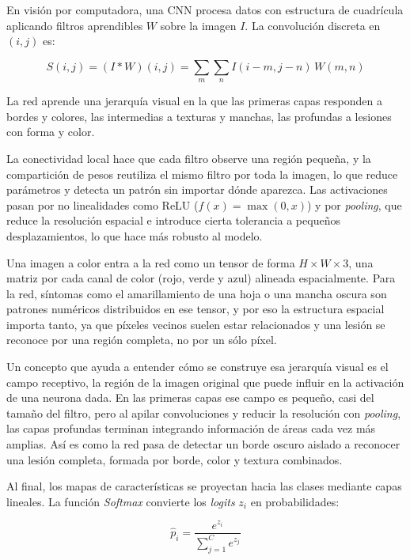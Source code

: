\documentclass[12pt,letterpaper]{article}
\begin{document}
En visión por computadora, una CNN procesa datos con estructura de cuadr\'icula aplicando filtros aprendibles $W$ sobre la imagen $I$. La convoluci\'on discreta en $(i,j)$ es:

\begin{equation}
S(i,j) = (I * W)(i,j) = \sum_{m}\sum_{n} I(i-m, j-n)\, W(m,n)
\end{equation}

La red aprende una jerarqu\'ia visual en la que las primeras capas responden a bordes y colores, las intermedias a texturas y manchas, las profundas a lesiones con forma y color.

La conectividad local hace que cada filtro observe una regi\'on peque\~na, y la compartici\'on de pesos reutiliza el mismo filtro por toda la imagen, lo que reduce par\'ametros y detecta un patr\'on sin importar d\'onde aparezca. Las activaciones pasan por no linealidades como ReLU ($f(x)=\max(0,x)$) y por \textit{pooling}, que reduce la resoluci\'on espacial e introduce cierta tolerancia a peque\~nos desplazamientos, lo que hace más robusto al modelo.

Una imagen a color entra a la red como un tensor de forma $H \times W \times 3$, una matriz por cada canal de color (rojo, verde y azul) alineada espacialmente. Para la red, s\'intomas como el amarillamiento de una hoja o una mancha oscura son patrones num\'ericos distribuidos en ese tensor, y por eso la estructura espacial importa tanto, ya que p\'ixeles vecinos suelen estar relacionados y una lesi\'on se reconoce por una regi\'on completa, no por un sólo p\'ixel.

Un concepto que ayuda a entender c\'omo se construye esa jerarqu\'ia visual es el campo receptivo, la regi\'on de la imagen original que puede influir en la activaci\'on de una neurona dada. En las primeras capas ese campo es peque\~no, casi del tama\~no del filtro, pero al apilar convoluciones y reducir la resoluci\'on con \textit{pooling}, las capas profundas terminan integrando informaci\'on de \'areas cada vez m\'as amplias. As\'i es como la red pasa de detectar un borde oscuro aislado a reconocer una lesi\'on completa, formada por borde, color y textura combinados.

Al final, los mapas de caracter\'isticas se proyectan hacia las clases mediante capas lineales. La funci\'on \textit{Softmax} convierte los \textit{logits} $z_i$ en probabilidades:

\begin{equation}
\hat{p}_i = \frac{e^{z_i}}{\sum_{j=1}^{C} e^{z_j}}
\end{equation}
\end{document}
